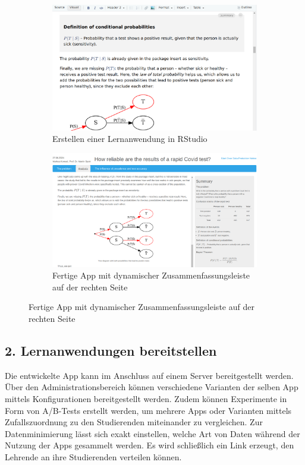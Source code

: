 \documentclass[a0,portrait]{a0poster}
\begin{document}
\begin{multicols}{2}
\vspace{1cm}

\begin{figure}[H]
\hfill
\begin{subfigure}[h]{0.45\linewidth}
\includegraphics[width=\linewidth]{at-visual-smaller}
\caption*{\footnotesize Erstellen einer Lernanwendung in RStudio}
\end{subfigure}
\hfill
\begin{subfigure}[h]{0.45\linewidth}
\includegraphics[width=\linewidth]{app-summary}
\caption*{\footnotesize Fertige App mit dynamischer Zusammenfassungsleiste auf der rechten Seite}
\end{subfigure}
\hfill
\end{figure}

\subsection*{2. Lernanwendungen bereitstellen}

Die entwickelte App kann im Anschluss auf einem Server bereitgestellt werden. Über den Administrationsbereich können verschiedene Varianten der selben App mittels Konfigurationen bereitgestellt werden. Zudem können Experimente in Form von A/B-Tests erstellt werden, um mehrere Apps oder Varianten mittels Zufallszuordnung zu den Studierenden miteinander zu vergleichen. Zur Datenminimierung lässt sich exakt einstellen, welche Art von Daten während der Nutzung der Apps gesammelt werden. Es wird schließlich ein Link erzeugt, den Lehrende an ihre Studierenden verteilen können.


\end{multicols}
\end{document}
